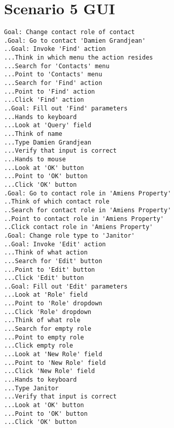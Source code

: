 \section{Scenario 5 GUI}
\label{section:scenario5gui}
\begin{verbatim}
Goal: Change contact role of contact
.Goal: Go to contact 'Damien Grandjean'
..Goal: Invoke 'Find' action
...Think in which menu the action resides
...Search for 'Contacts' menu
...Point to 'Contacts' menu
...Search for 'Find' action
...Point to 'Find' action
...Click 'Find' action
..Goal: Fill out 'Find' parameters
...Hands to keyboard
...Look at 'Query' field
...Think of name
...Type Damien Grandjean
...Verify that input is correct
...Hands to mouse
...Look at 'OK' button
...Point to 'OK' button
...Click 'OK' button
.Goal: Go to contact role in 'Amiens Property'
..Think of which contact role
..Search for contact role in 'Amiens Property'
..Point to contact role in 'Amiens Property'
..Click contact role in 'Amiens Property' 
.Goal: Change role type to 'Janitor'
..Goal: Invoke 'Edit' action
...Think of what action
...Search for 'Edit' button
...Point to 'Edit' button
...Click 'Edit' button
..Goal: Fill out 'Edit' parameters
...Look at 'Role' field
...Point to 'Role' dropdown
...Click 'Role' dropdown
...Think of what role
...Search for empty role
...Point to empty role
...Click empty role
...Look at 'New Role' field
...Point to 'New Role' field
...Click 'New Role' field
...Hands to keyboard
...Type Janitor
...Verify that input is correct
...Look at 'OK' button
...Point to 'OK' button
...Click 'OK' button
\end{verbatim}

